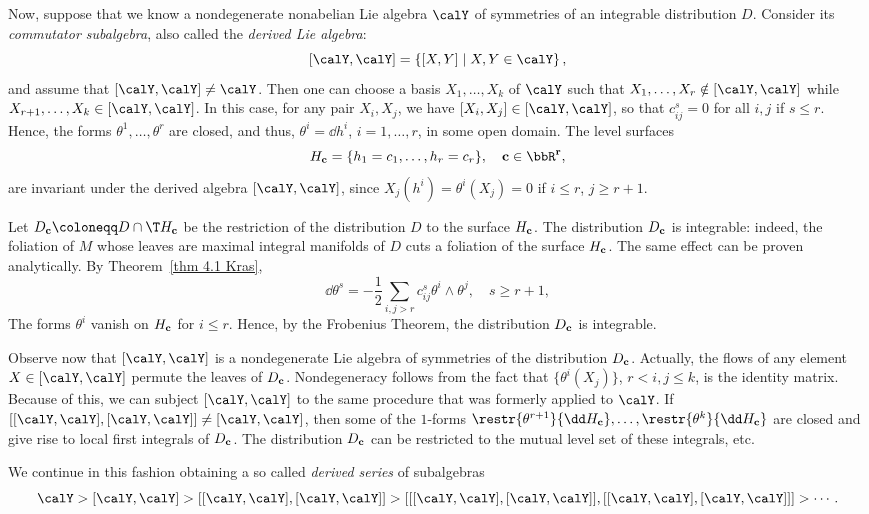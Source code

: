Now, suppose that we know a nondegenerate nonabelian Lie algebra $\calY$ of symmetries of an integrable distribution $D$. Consider its \emph{commutator subalgebra}, also called the \emph{derived Lie algebra}: 
\[[\calY,\calY]=\left\{[X,Y]\mid X,Y\in\calY\right\},\]
and assume that $[\calY,\calY]\neq\calY$. Then one can choose a basis $X_1,\ldots,X_k$ of $\calY$ such that $X_1,\ldots,X_r\notin [\calY,\calY]$ while $X_{r+1},\ldots,X_k\in [\calY,\calY]$. In this case, for any pair $X_i,X_j$, we have $[X_i,X_j]\in[\calY,\calY]$, so that $c^s_{ij}=0$ for all $i,j$ if $s\leq r$. Hence, the forms $\theta^1,\ldots,\theta^r$ are closed, and thus, $\theta^i=\dd h^i$, $i=1,\ldots,r$, in some open domain. The level surfaces 
\[H_{\bf{c}}=\{h_1=c_1,\ldots,h_r=c_r\},\quad \bf{c}\in\bbR^r,\]
are invariant under the derived algebra $[\calY,\calY]$, since $X_j(h^i)=\theta^i(X_j)=0$ if $i\leq r$, $j\geq r+1$.

Let $D_{\bf{c}}\coloneqq D\cap \T H_{\bf{c}}$ be the restriction of the distribution $D$ to the surface $H_{\bf{c}}$. The distribution $D_{\bf{c}}$ is integrable: indeed, the foliation of $M$ whose leaves are maximal integral manifolds of $D$ cuts a foliation of the surface $H_{\bf{c}}$. The same effect can be proven analytically. By Theorem~\ref{thm 4.1 Kras}, 
\[\dd\theta^s=-\frac12\sum_{i,j>r}c^s_{ij}\theta^i\wedge\theta^j,\quad s\geq r+1,\]
The forms $\theta^i$ vanish on $H_{\bf{c}}$ for $i\leq r$. Hence, by the Frobenius Theorem, the distribution $D_{\bf{c}}$ is integrable.

Observe now that $[\calY,\calY]$ is a nondegenerate Lie algebra of symmetries of the distribution $D_{\bf{c}}$. Actually, the flows of any element $X\in [\calY,\calY]$ permute the leaves of $D_{\bf{c}}$. Nondegeneracy follows from the fact that $\{\theta^i(X_j)\}$, $r<i,j\leq k$, is the identity matrix. Because of this, we can subject $[\calY,\calY]$ to the same procedure that was formerly applied to $\calY$. If $[[\calY,\calY],[\calY,\calY]]\neq [\calY,\calY]$, then some of the $1$-forms $\restr{\theta^{r+1}}{\dd H_{\bf{c}}},\ldots,\restr{\theta^k}{\dd H_{\bf{c}}}$ are closed and give rise to local first integrals of $D_{\bf{c}}$. The distribution $D_{\bf{c}}$ can be restricted to the mutual level set of these integrals, etc.

We continue in this fashion obtaining a so called \emph{derived series} of subalgebras 
\[\calY>[\calY,\calY]>[[\calY,\calY],[\calY,\calY]]>[[[\calY,\calY],[\calY,\calY]],[[\calY,\calY],[\calY,\calY]]]>\cdots.\]

